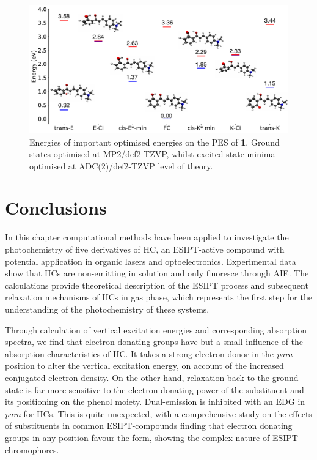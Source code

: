 \begin{figure}
\centering
  \includegraphics[width=0.9\linewidth]{3nonradiativedecay/HC_1_energylevels_ADC2.pdf}
  \caption[Energies of important optimised states for \textbf{1}]{Energies of important optimised energies on the \ac{PES} of \textbf{1}. Ground states optimised at MP2/def2-TZVP, whilst excited state minima optimised at ADC(2)/def2-TZVP level of theory.}
  \label{figure: HC_1_Energylevels_ADC2}
\end{figure}

\section{Conclusions}\label{section: NRdecay_Conclusions}
In this chapter computational methods have been applied to investigate the photochemistry of five derivatives of \ac{HC}, an ESIPT-active compound with potential application in organic lasers and optoelectronics. Experimental data show that \ac{HC}s are non-emitting in solution and only fluoresce through \ac{AIE}.\cite{Cheng2015} The calculations provide theoretical description of the ESIPT process and subsequent relaxation mechanisms of \ac{HC}s in gas phase, which represents the first step for the understanding of the photochemistry of these systems. 

Through calculation of vertical excitation energies and corresponding absorption spectra, we find that electron donating groups have but a small influence of the absorption characteristics of \ac{HC}. It takes a strong electron donor in the \textit{para} position to alter the vertical excitation energy, on account of the increased conjugated electron density. On the other hand, relaxation back to the ground state is far more sensitive to the electron donating power of the substituent and its positioning on the phenol moiety. Dual-emission is inhibited with an EDG in \textit{para} for \ac{HC}s. This is quite unexpected, with a comprehensive study on the effects of substituents in common ESIPT-compounds finding that electron donating groups in any position favour the \Estar{} form, showing the complex nature of ESIPT chromophores.\cite{Azarias2016}

